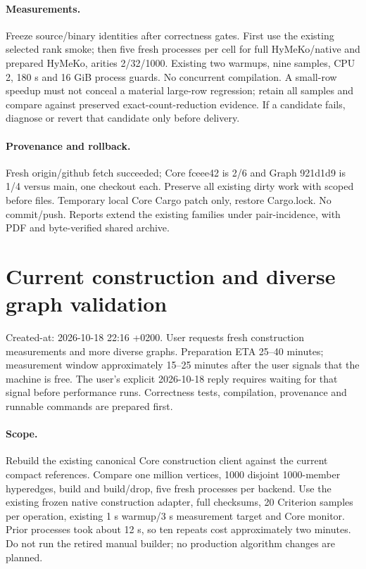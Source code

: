 \documentclass[11pt,a4paper]{article}
\begin{document}
\paragraph{Measurements.} Freeze source/binary identities after correctness gates.
First use the existing selected rank smoke; then five fresh processes per cell
for full HyMeKo/native and prepared HyMeKo, arities 2/32/1000. Existing two warmups,
nine samples, CPU 2, 180 s and 16 GiB process guards. No concurrent compilation.
A small-row speedup must not conceal a material large-row regression; retain all
samples and compare against preserved exact-count-reduction evidence. If a
candidate fails, diagnose or revert that candidate only before delivery.
\paragraph{Provenance and rollback.} Fresh origin/github fetch succeeded; Core
fceee42 is 2/6 and Graph 921d1d9 is 1/4 versus main, one checkout each. Preserve
all existing dirty work with scoped before files. Temporary local Core Cargo
patch only, restore Cargo.lock. No commit/push. Reports extend the existing
families under pair-incidence, with PDF and byte-verified shared archive.


\newpage\section*{Current construction and diverse graph validation}
Created-at: 2026-10-18 22:16 +0200. User requests fresh construction measurements and more diverse
graphs. Preparation ETA 25--40 minutes; measurement window approximately 15--25
minutes after the user signals that the machine is free. The user's explicit
2026-10-18 reply requires waiting for that signal before performance runs.
Correctness tests, compilation, provenance and runnable commands are prepared first.
\paragraph{Scope.} Rebuild the existing canonical Core construction client against
the current compact references. Compare one million vertices, 1000 disjoint
1000-member hyperedges, build and build/drop, five fresh processes per backend.
Use the existing frozen native construction adapter, full checksums, 20 Criterion
samples per operation, existing 1 s warmup/3 s measurement target and Core monitor.
Prior processes took about 12 s, so ten repeats cost approximately two minutes.
Do not run the retired manual builder; no production algorithm changes are planned.
\end{document}
